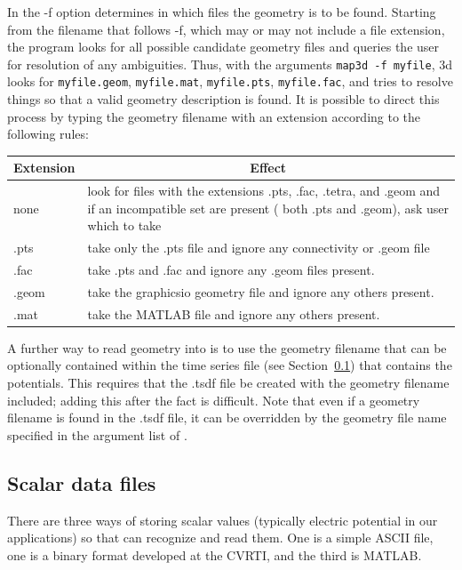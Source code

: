 In \map{} the -f option determines in which files the geometry is to be
found.  Starting from the filename that follows -f, which may or may not
include a file extension, the program looks for all possible candidate
geometry files and queries the user for resolution of any ambiguities.
Thus, with the arguments {\tt map3d -f myfile}, \map3d{} looks for
\texttt{myfile.geom}, \texttt{myfile.mat}, \texttt{myfile.pts},
\texttt{myfile.fac}, \etc{} and tries to resolve things so that a valid
geometry description is found.  It is possible to direct this process by
typing the geometry filename with an extension according to the following
rules:
%
\begin{center}
\begin{tabular}{|l|p{4in}|} \hline
\multicolumn{1}{|c|}{Extension} &
\multicolumn{1}{|c|}{Effect} \\ \hline
none & look for files with the extensions .pts, .fac, .tetra, and .geom and
if an incompatible set are present (\eg{} both .pts and .geom), ask user
which to take \\ 
.pts & take only the .pts file and ignore any connectivity or .geom file \\
.fac & take .pts and .fac and ignore any .geom files present. \\
.geom & take the graphicsio geometry file and ignore any others present. \\
.mat & take the MATLAB file and ignore any others present. \\ \hline
\end{tabular}
\end{center}

A further way to read geometry into \map{} is to use the geometry filename
that can be optionally contained within the time series file (see
Section~\ref{sec:datafiles}) that contains the potentials.  This requires
that the .tsdf file be created with the geometry filename
included; adding this after the fact is difficult.  Note that even if a
geometry filename is found in the .tsdf file, it can be overridden
by the geometry file name specified in the argument list of \map{}.


\subsection{Scalar data files}
\label{sec:datafiles} 

There are three ways of storing scalar values (typically electric potential
in our applications) so that \map{} can recognize and read them.  One is a
simple ASCII file, one is a binary format developed at the
CVRTI\@, and the third is MATLAB. 

